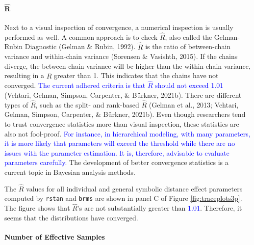 \documentclass[
  english,
  doc,floatsintext]{apa6}
\let\oldparagraph\paragraph
\renewcommand{\paragraph}[1]{\oldparagraph{#1}\mbox{}}
\begin{document}
\hypertarget{hatbmr}{%
\paragraph{\texorpdfstring{\(\hat{\bm{R}}\)}{\textbackslash hat\{\textbackslash bm\{R\}\}}}\label{hatbmr}}

Next to a visual inspection of convergence, a numerical inspection is usually performed as well. A common approach is to check \(\hat{R}\), also called the Gelman-Rubin Diagnostic (Gelman \& Rubin, 1992). \(\hat{R}\) is the ratio of between-chain variance and within-chain variance (Sorensen \& Vasishth, 2015). If the chains diverge, the between-chain variance will be higher than the within-chain variance, resulting in a \(\hat{R}\) greater than 1. This indicates that the chains have not converged. \textcolor{blue}{The current adhered criteria is that $\hat{R}$ should not exceed 1.01 }(Vehtari, Gelman, Simpson, Carpenter, \& Bürkner, 2021b). There are different types of \(\hat{R}\), such as the split- and rank-based \(\hat{R}\) (Gelman et al., 2013; Vehtari, Gelman, Simpson, Carpenter, \& Bürkner, 2021b). Even though researchers tend to trust convergence statistics more than visual inspection, these statistics are also not fool-proof. \textcolor{blue}{For instance, in hierarchical modeling, with many parameters, it is more likely that parameters will exceed the threshold while there are no issues with the parameter estimation. It is, therefore, advisable to evaluate parameters carefully.} The development of better convergence statistics is a current topic in Bayesian analysis methods.

The \(\hat{R}\) values for all individual and general symbolic distance effect parameters computed by \texttt{rstan} and \texttt{brms} are shown in panel C of Figure \ref{fig:traceplots3p}. The figure shows that \(\hat{R}\)'s are not substantially greater than \textcolor{blue}{1.01}. Therefore, it seems that the distributions have converged.

\hypertarget{number-of-effective-samples}{%
\paragraph{Number of Effective Samples}\label{number-of-effective-samples}}
\end{document}
